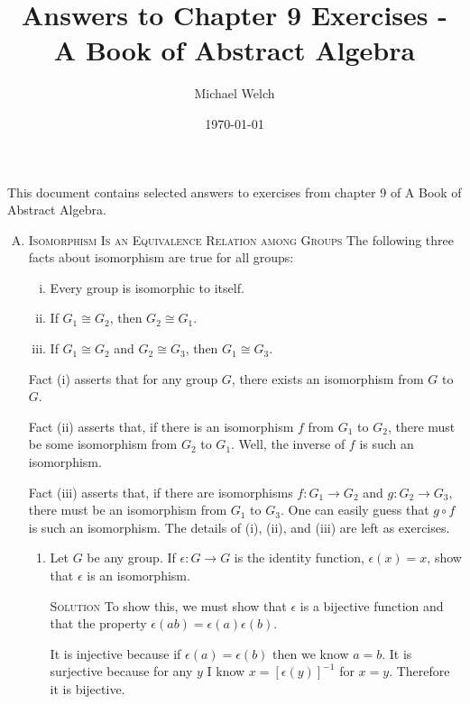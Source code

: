 \documentclass[twoside]{amsart}
\newcommand{\solution}{\textsc{Solution}\xspace}
\newcommand{\iso}{\cong}
\newcommand{\blank}{\vspace{5pt}}
\begin{document}
\title{Answers to Chapter 9 Exercises - A Book of Abstract Algebra}
\author{Michael Welch}
\date{\today}
\maketitle

This document contains selected answers to exercises from chapter 9
of A Book of Abstract Algebra.


\begin{enumerate}[A.]
   \item \textsc{Isomorphism Is an Equivalence Relation among Groups}
	The following three facts about isomorphism are true for all groups:

	\blank
	\begin{enumerate}[(i)]
	   \item Every group is isomorphic to itself.
		\item If $G_1 \iso G_2$, then $G_2 \iso G_1$.
		\item If $G_1 \iso G_2$ and $G_2 \iso G_3$, then $G_1 \iso G_3$.
	\end{enumerate}
	\blank

	Fact (i) asserts that for any group $G$, there exists an isomorphism 
	from $G$ to $G$.

	Fact (ii) asserts that, if there is an isomorphism $f$ from $G_1$ to
	$G_2$, there must be some isomorphism from $G_2$ to $G_1$. Well, the
	inverse of $f$ is such an isomorphism.

	Fact (iii) asserts that, if there are isomorphisms $f : G_1 \to G_2$ and
	$g : G_2 \to G_3$, there must be an isomorphism from $G_1$ to $G_3$. One can
	easily guess that $g \circ f$ is such an isomorphism. The details of
	(i), (ii), and (iii) are left as exercises.
	\blank

   \begin{enumerate}[1]
	
	\item Let $G$ be any group. If $\epsilon : G \to G$ is the identity
	function, $\epsilon(x) = x$, show that $\epsilon$ is an isomorphism.

	\blank \noindent \solution To show this, we must show that
	$\epsilon$ is a bijective function and that the property
	$\epsilon(ab)=\epsilon(a)\epsilon(b)$.

	It is injective because if $\epsilon(a)=\epsilon(b)$ then we know
	$a=b$. It is surjective because for any $y$ I know $x = [\epsilon(y)]^{-1}$
	for $x=y$. Therefore it is bijective.


\end{enumerate}
\end{enumerate}
\end{document}
